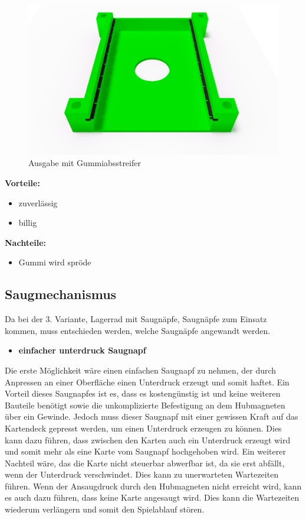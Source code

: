 \begin{enumerate}
\begin{figure}[H]
    \centering
    \includegraphics[scale=0.5,page=1]{fig/mech/AusgabeMitGummiabstreifer}
    \caption{Ausgabe mit Gummiabsstreifer}
\end{figure}

\textbf{Vorteile:}
\begin{itemize}
    \item zuverlässig
    \item billig
\end{itemize}
\textbf{Nachteile:}
\begin{itemize}
    \item Gummi wird spröde
\end{itemize}
\end{enumerate}

\subsection{Saugmechanismus}

Da bei der 3. Variante, Lagerrad mit Saugnäpfe, Saugnäpfe zum Einsatz kommen, muss entschieden werden, welche Saugnäpfe angewandt werden.

\begin{itemize}
    \item \textbf{einfacher unterdruck Saugnapf}
\end{itemize}
Die erste Möglichkeit wäre einen einfachen Saugnapf zu nehmen, der durch Anpressen an einer Oberfläche einen Unterdruck erzeugt und somit haftet. Ein Vorteil dieses Saugnapfes ist es, dass es kostengünstig ist und keine weiteren Bauteile benötigt sowie die
unkomplizierte Befestigung an dem Hubmagneten über ein Gewinde.
Jedoch muss dieser Saugnapf mit einer gewissen Kraft auf das Kartendeck gepresst werden, um einen Unterdruck erzeugen zu können. Dies kann dazu führen, dass zwischen den Karten auch ein Unterdruck erzeugt wird und somit mehr als eine Karte vom Saugnapf
hochgehoben wird. Ein weiterer Nachteil wäre, das die Karte nicht steuerbar abwerfbar ist, da sie erst abfällt, wenn der Unterdruck verschwindet. Dies kann zu unerwarteten Wartezeiten führen. Wenn der Ansaugdruck durch den Hubmagneten nicht erreicht wird, kann
es auch dazu führen, dass keine Karte angesaugt wird. Dies kann die Wartezeiten wiederum verlängern und somit den Spielablauf stören.

